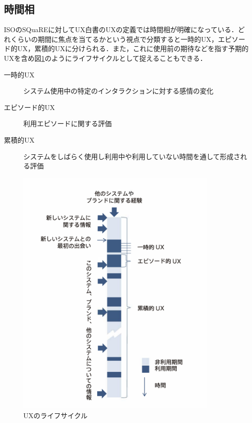 \subsection{時間相}

ISOのSQuaREに対してUX白書のUXの定義では時間相が明確になっている．どれくらいの期間に焦点を当てるかという視点で分類すると一時的UX，エピソード的UX，累積的UXに分けられる．また，これに使用前の期待などを指す予期的UXを含め図\ref{fig:lifecycle}のようにライフサイクルとして捉えることもできる\cite{uxwhitepaper}．

\begin{description}
   \item[一時的UX]システム使用中の特定のインタラクションに対する感情の変化
   \item[エピソード的UX]利用エピソードに関する評価
   \item[累積的UX]システムをしばらく使用し利用中や利用していない時間を通して形成される評価
\end{description}

\begin{figure}[htbp]
  \begin{minipage}{\hsize}
    \begin{center}
       \includegraphics[width=100mm]{img/lifecycle.png}
    \end{center}
    \caption{UXのライフサイクル\cite{uxwhitepaper}}
    \label{fig:lifecycle}
  \end{minipage}
\end{figure}

